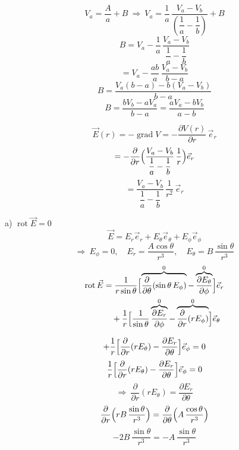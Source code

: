 \documentclass[11pt,a4paper]{article}
\begin{document}
\[ V_a=\frac{A}{a}+B \ \Rightarrow\ V_a=\frac{1}{a}\,\frac{V_a-V_b}{\left(\dfrac{1}{a}-\dfrac{1}{b}\right)}+B \]
\[ B=V_a-\frac{1}{a}\,\frac{V_a-V_b}{\dfrac{1}{a}-\dfrac{1}{b}} \]
\[ =V_a-\frac{ab}{a}\,\frac{V_a-V_b}{b-a} \]
\[ B=\frac{V_a(b-a)-b(V_a-V_b)}{b-a} \]
\[ B=\frac{bV_b-aV_a}{b-a}=\frac{aV_a-bV_b}{a-b} \]


\[ \vec E(r)=-\operatorname{grad}V=-\frac{\partial V(r)}{\partial r}\,\vec e_r \]
\[ =-\frac{\partial}{\partial r}\Bigl(\frac{V_a-V_b}{\dfrac{1}{a}-\dfrac{1}{b}}\,\frac{1}{r}\Bigr)\vec e_r \]
\[ =\frac{V_a-V_b}{\dfrac{1}{a}-\dfrac{1}{b}}\,\frac{1}{r^2}\,\vec e_r \]

\medskip
{}


a) $\operatorname{rot}\vec E=0$
\[ \vec E=E_r\vec e_r+E_\theta\vec e_\theta+E_\phi\vec e_\phi \]
\[ \Rightarrow\ E_\phi=0,\quad E_r=\frac{A\cos\theta}{r^3},\quad E_\theta=B\,\frac{\sin\theta}{r^3} \]
\begin{align*}
  \operatorname{rot}\vec E &= \frac{1}{r\sin\theta}\Bigl[\overbrace{\frac{\partial}{\partial\theta}(\sin\theta\,E_\phi)}^{0}-\overbrace{\frac{\partial E_\theta}{\partial\phi}}^{0}\Bigr]\vec e_r \\
  &\quad+\frac{1}{r}\Bigl[\frac{1}{\sin\theta}\overbrace{\frac{\partial E_r}{\partial\phi}}^{0}-\overbrace{\frac{\partial}{\partial r}(rE_\phi)}^{0}\Bigr]\vec e_\theta
\end{align*}

\[ +\frac{1}{r}\Bigl[\frac{\partial}{\partial r}(rE_\theta)-\frac{\partial E_r}{\partial\theta}\Bigr]\vec e_\phi=0 \]
\[ \frac{1}{r}\Bigl[\frac{\partial}{\partial r}(rE_\theta)-\frac{\partial E_r}{\partial\theta}\Bigr]\vec e_\phi=0 \]
\[ \Rightarrow\ \frac{\partial}{\partial r}(rE_\theta)=\frac{\partial E_r}{\partial\theta} \]
\[ \frac{\partial}{\partial r}\Bigl(rB\,\frac{\sin\theta}{r^3}\Bigr)=\frac{\partial}{\partial\theta}\Bigl(A\,\frac{\cos\theta}{r^3}\Bigr) \]
\[ -2B\,\frac{\sin\theta}{r^3}=-A\,\frac{\sin\theta}{r^3} \]
\end{document}
